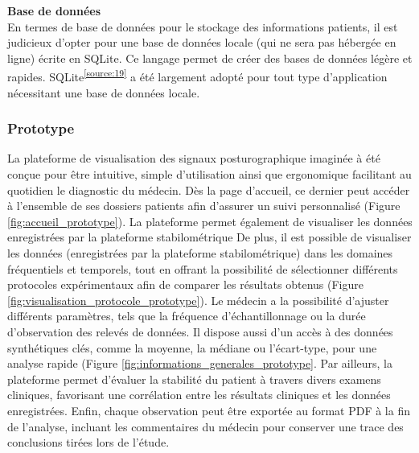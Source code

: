 \textbf{Base de données} \\
En termes de base de données pour le stockage des informations patients, il est judicieux d’opter pour une base de données locale (qui ne sera pas hébergée en ligne) écrite en SQLite.
Ce langage permet de créer des bases de données légère et rapides.
SQLite\textsuperscript{\ref{source:19}} a été largement adopté pour tout type d’application nécessitant une base de données locale.

\subsubsection{Prototype}
La plateforme de visualisation des signaux posturographique imaginée à été conçue 
pour être intuitive, simple d’utilisation ainsi que ergonomique facilitant au 
quotidien le diagnostic du médecin. Dès la page d’accueil, ce dernier peut accéder 
à l’ensemble de ses dossiers patients afin d’assurer un suivi personnalisé 
(Figure \ref{fig:accueil_prototype}). La plateforme permet également de visualiser les données 
enregistrées par la plateforme stabilométrique 
De plus, il est possible de visualiser les données 
(enregistrées par la plateforme stabilométrique) dans les domaines fréquentiels 
et temporels, tout en offrant la possibilité de sélectionner différents protocoles 
expérimentaux afin de comparer les résultats obtenus (Figure \ref{fig:visualisation_protocole_prototype}). 
Le médecin a la possibilité d’ajuster différents paramètres, tels que la fréquence 
d’échantillonnage ou la durée d’observation des relevés de données.  Il dispose 
aussi d’un accès à des données synthétiques clés, comme la moyenne, la médiane ou 
l’écart-type, pour une analyse rapide (Figure \ref{fig:informations_generales_prototype}. Par ailleurs, la plateforme 
permet d’évaluer la stabilité du patient à travers divers examens cliniques, 
favorisant une corrélation entre les résultats cliniques et les données 
enregistrées. Enfin, chaque observation peut être exportée au format PDF à la fin 
de l’analyse, incluant les commentaires du médecin pour conserver une trace des 
conclusions tirées lors de l’étude.

